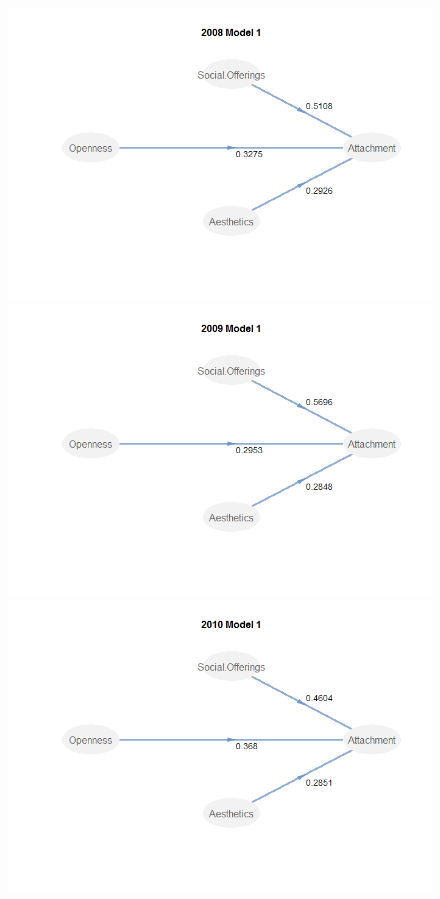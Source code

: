 \documentclass[11pt]{asaproc}
\begin{document}
\begin{figure}[H]
\begin{framed}
\begin{minipage}[b]{0.45\linewidth}
\centering
\includegraphics[width=\textwidth]{Mod12008.png}
\end{minipage}
\hspace{0.5cm}
\begin{minipage}[b]{0.45\linewidth}
\centering
\includegraphics[width=\textwidth]{Mod12009.png}
\end{minipage}
\hspace{0.5cm}
\begin{minipage}[b]{0.45\linewidth}
\centering
\includegraphics[width=\textwidth]{Mod12010.png}

\end{minipage}
\end{framed}
\end{figure}
\end{document}
